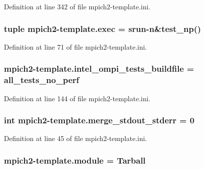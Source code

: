 Definition at line 342 of file mpich2-\/template.\-ini.

\hypertarget{namespacempich2-template_a3e54d8824fc59af417917b87182bdeb7}{
\subsubsection[{exec}]{\setlength{\rightskip}{0pt plus 5cm}tuple mpich2-\/template.\-exec = srun-\/n\&test\-\_\-np()}}\label{namespacempich2-template_a3e54d8824fc59af417917b87182bdeb7}


Definition at line 71 of file mpich2-\/template.\-ini.

\hypertarget{namespacempich2-template_addb99c522a88e9f52ea85bfbb54d50be}{
\subsubsection[{intel\-\_\-ompi\-\_\-tests\-\_\-buildfile}]{\setlength{\rightskip}{0pt plus 5cm}mpich2-\/template.\-intel\-\_\-ompi\-\_\-tests\-\_\-buildfile = all\-\_\-tests\-\_\-no\-\_\-perf}}\label{namespacempich2-template_addb99c522a88e9f52ea85bfbb54d50be}


Definition at line 144 of file mpich2-\/template.\-ini.

\hypertarget{namespacempich2-template_a473952e84102b337ba25c3d8607f4f4f}{
\subsubsection[{merge\-\_\-stdout\-\_\-stderr}]{\setlength{\rightskip}{0pt plus 5cm}int mpich2-\/template.\-merge\-\_\-stdout\-\_\-stderr = 0}}\label{namespacempich2-template_a473952e84102b337ba25c3d8607f4f4f}


Definition at line 45 of file mpich2-\/template.\-ini.

\hypertarget{namespacempich2-template_abea5cd73818946f1fc5576eaa63c349e}{
\subsubsection[{module}]{\setlength{\rightskip}{0pt plus 5cm}mpich2-\/template.\-module = Tarball}}\label{namespacempich2-template_abea5cd73818946f1fc5576eaa63c349e}


